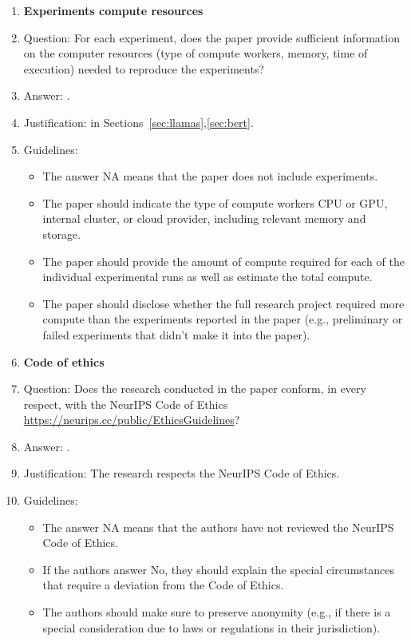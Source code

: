 \documentclass{article}
\begin{document}
{\begin{enumerate}
\item {\bf Experiments compute resources}
    \item[] Question: For each experiment, does the paper provide sufficient information on the computer resources (type of compute workers, memory, time of execution) needed to reproduce the experiments?
    \item[] Answer: \answerYes{}.
    \item[] Justification: in Sections~\ref{sec:llamas},\ref{sec:bert}.
    \item[] Guidelines:
    \begin{itemize}
        \item The answer NA means that the paper does not include experiments.
        \item The paper should indicate the type of compute workers CPU or GPU, internal cluster, or cloud provider, including relevant memory and storage.
        \item The paper should provide the amount of compute required for each of the individual experimental runs as well as estimate the total compute. 
        \item The paper should disclose whether the full research project required more compute than the experiments reported in the paper (e.g., preliminary or failed experiments that didn't make it into the paper). 
    \end{itemize}
    
\item {\bf Code of ethics}
    \item[] Question: Does the research conducted in the paper conform, in every respect, with the NeurIPS Code of Ethics \url{https://neurips.cc/public/EthicsGuidelines}?
    \item[] Answer: \answerYes{}.
    \item[] Justification: The research respects the NeurIPS Code of Ethics.
    \item[] Guidelines:
    \begin{itemize}
        \item The answer NA means that the authors have not reviewed the NeurIPS Code of Ethics.
        \item If the authors answer No, they should explain the special circumstances that require a deviation from the Code of Ethics.
        \item The authors should make sure to preserve anonymity (e.g., if there is a special consideration due to laws or regulations in their jurisdiction).
    \end{itemize}



\end{enumerate}}
\end{document}
